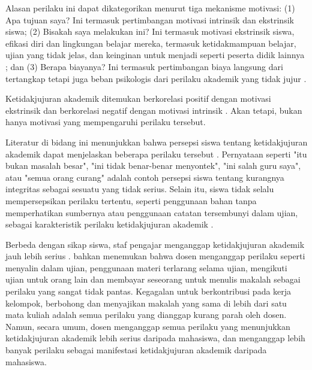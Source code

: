 Alasan perilaku ini dapat dikategorikan menurut tiga mekanisme motivasi: (1) Apa tujuan saya? Ini termasuk pertimbangan motivasi intrinsik dan ekstrinsik siswa; (2) Bisakah saya melakukan ini? Ini termasuk motivasi ekstrinsik siswa, efikasi diri dan lingkungan belajar mereka, termasuk ketidakmampuan belajar, ujian yang tidak jelas, dan keinginan untuk menjadi seperti peserta didik lainnya \citep{bertram2017academic} \citep{etgar2019white} \citep{murdock2006motivational}; dan (3) Berapa biayanya? Ini termasuk pertimbangan biaya langsung dari tertangkap tetapi juga beban psikologis dari perilaku akademik yang tidak jujur \citep{bertram2017academic} \citep{etgar2019white} \citep{murdock2006motivational}.

Ketidakjujuran akademik ditemukan berkorelasi positif dengan motivasi ekstrinsik \citep{barbaranelli2018machiavellian} \citep{grira2019rationality} \citep{krou2020achievement} \citep{murdock2006motivational} dan berkorelasi negatif dengan motivasi intrinsik \citep{foltynek2018analysis} \citep{barbaranelli2018machiavellian} \citep{grira2019rationality} \citep{murdock2006motivational}. Akan tetapi, bukan hanya motivasi yang mempengaruhi perilaku tersebut.

Literatur di bidang ini menunjukkan bahwa persepsi siswa tentang ketidakjujuran akademik dapat menjelaskan beberapa perilaku tersebut \citep{kiekkas2020reasons}. Pernyataan seperti "itu bukan masalah besar", "ini tidak benar-benar menyontek", "ini salah guru saya", atau "semua orang curang" \citep{stephens2007does} adalah contoh persepsi siswa tentang kurangnya integritas sebagai sesuatu yang tidak serius. Selain itu, siswa tidak selalu mempersepsikan perilaku tertentu, seperti penggunaan bahan tanpa memperhatikan sumbernya \citep{moss2018systematic} atau penggunaan catatan tersembunyi dalam ujian, sebagai karakteristik perilaku ketidakjujuran akademik \citep{kiekkas2020reasons}.

Berbeda dengan sikap siswa, staf pengajar menganggap ketidakjujuran akademik jauh lebih serius \citep{blau2021violation} \citep{stevens2013promoting}. \citet*{pincus2003faculty} bahkan menemukan bahwa dosen menganggap perilaku seperti menyalin dalam ujian, penggunaan materi terlarang selama ujian, mengikuti ujian untuk orang lain dan membayar seseorang untuk menulis makalah sebagai perilaku yang sangat tidak pantas. Kegagalan untuk berkontribusi pada kerja kelompok, berbohong dan menyajikan makalah yang sama di lebih dari satu mata kuliah adalah semua perilaku yang dianggap kurang parah oleh dosen. Namun, secara umum, dosen menganggap semua perilaku yang menunjukkan ketidakjujuran akademik lebih serius daripada mahasiswa, dan menganggap lebih banyak perilaku sebagai manifestasi ketidakjujuran akademik daripada mahasiswa.

